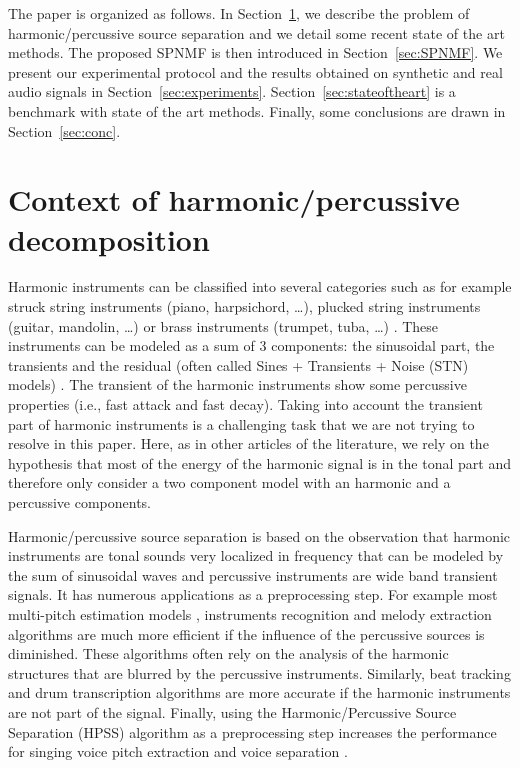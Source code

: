\documentclass[journal]{IEEEtran}
\begin{document}
The paper is organized as follows. In Section~\ref{sec:Background}, we describe the problem of harmonic/percussive source separation and we detail some recent state of the art methods. The proposed SPNMF is then introduced in Section~\ref{sec:SPNMF}. We present our experimental protocol and the results obtained on synthetic and real audio signals in Section~\ref{sec:experiments}. Section~\ref{sec:stateoftheart} is a benchmark with state of the art methods. Finally, some conclusions are drawn in Section~\ref{sec:conc}.



\section{Context of harmonic/percussive decomposition}\label{sec:Background}


Harmonic instruments can be classified into several categories such as for example struck string instruments (piano, harpsichord, \ldots), plucked string instruments (guitar, mandolin, \ldots) or brass instruments (trumpet, tuba, \ldots) \cite{peeters2003automatic}. 
These instruments can be modeled as a sum of $3$ components: the sinusoidal part, the transients and the residual (often called Sines + Transients + Noise (STN) models) \cite{daudet2006review}. The transient of the harmonic instruments show some percussive properties (i.e., fast attack and fast decay). Taking into account the transient part of harmonic instruments is a challenging task that we are not trying to resolve in this paper. Here, as in other articles of the literature, we rely on the hypothesis that most of the energy of the harmonic signal is in the tonal part and therefore only consider a two component model with an harmonic and a percussive components.

Harmonic/percussive source separation is based on the observation that harmonic instruments are tonal sounds very localized in frequency that can be modeled by the sum of sinusoidal waves and percussive instruments are wide band transient signals. It has numerous applications as a preprocessing step. For example most multi-pitch estimation models \cite{klapuri2008multipitch}, instruments recognition and melody extraction \cite{salamon2012melody} algorithms are much more efficient if the influence of the percussive sources is diminished. These algorithms often rely on the analysis of the harmonic structures that are blurred by the percussive instruments. Similarly, beat tracking \cite{ellis2007beat} 
and drum transcription algorithms \cite{paulus2005drum} are more accurate if the harmonic instruments are not part of the signal. Finally, using the Harmonic/Percussive Source Separation (HPSS) algorithm \cite{fitzgerald2010harmonic} as a preprocessing step increases the performance for singing voice pitch extraction and voice separation \cite{hsu2012tandem}.
\end{document}
